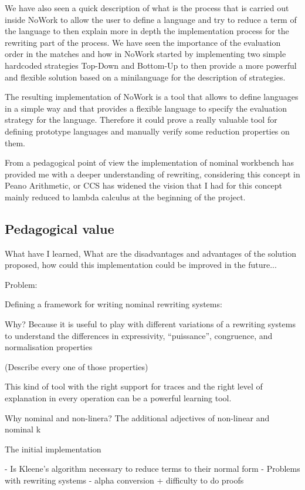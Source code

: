 \documentclass[12pt,a4paper]{article}
\begin{document}
We have also seen a quick description of what is the process that is
carried out inside NoWork to allow the user to define a language and
try to reduce a term of the language to then explain more in depth the
implementation process for the rewriting part of the process. We have
seen the importance of the evaluation order in the matches and how in
NoWork started by implementing two simple hardcoded strategies
Top-Down and Bottom-Up to then provide a more powerful and flexible
solution based on a minilanguage for the description of strategies.

The resulting implementation of NoWork is a tool that allows to
define languages in a simple way and that provides a flexible language
to specify the evaluation strategy for the language. Therefore it
could prove a really valuable tool for defining prototype languages
and manually verify some reduction properties on them.

From a pedagogical point of view the implementation of nominal
workbench has provided me with a deeper understanding of rewriting,
considering this concept in Peano Arithmetic, or CCS has widened the
vision that I had for this concept mainly reduced to lambda calculus
at the beginning of the project.


\subsection{ Pedagogical value }
What have I learned, What are the disadvantages and advantages of the
solution proposed, how could this implementation could be improved in
the future...

Problem:

Defining a framework for writing nominal rewriting systems:

Why? Because it is useful to play with different variations of a
rewriting systems to understand the differences in expressivity, ``puissance'',
congruence, and normalisation properties

(Describe every one of those properties)

This kind of tool with the right support for traces and the right level of explanation in every
operation can be a powerful learning tool.

Why nominal and non-linera? The additional adjectives of non-linear and nominal 
k


The initial implementation

- Is Kleene's algorithm necessary to reduce terms to their normal form
- Problems with rewriting systems
  - alpha conversion + difficulty to do proofs
\end{document}
